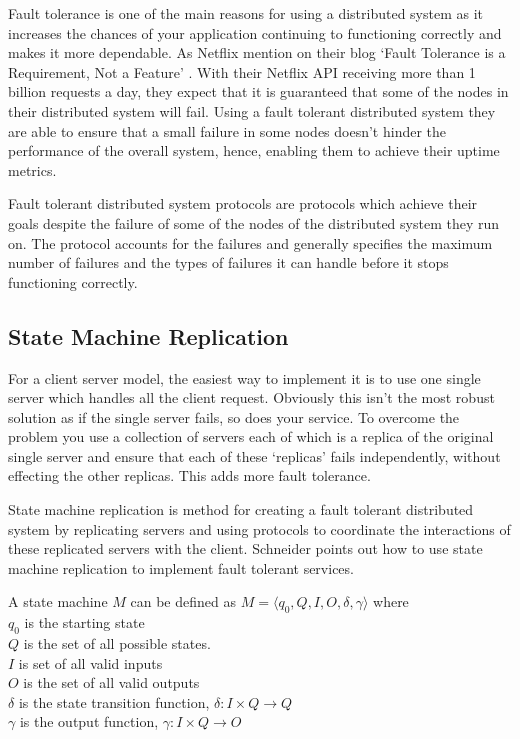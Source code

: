 Fault tolerance is one of the main reasons for using a distributed system as it
increases the chances of your application continuing to functioning correctly and
makes it more dependable. As Netflix mention on their blog
`Fault Tolerance is a Requirement, Not a Feature' \cite{20}.
With their Netflix API receiving more than 1 billion requests a day, they expect
that it is guaranteed that some of the nodes in their distributed system will fail.
Using a fault tolerant distributed system they are able to ensure that a small failure
in some nodes doesn't hinder the performance of the overall system, hence,
enabling them to achieve their uptime metrics.

Fault tolerant distributed system protocols are protocols which achieve their
goals despite the failure of some of the nodes of the distributed system they run on.
The protocol accounts for the failures and generally specifies the maximum number of
failures and the types of failures it can handle before it stops functioning correctly.

\subsection{State Machine Replication}

For a client server model, the easiest way to implement it is to use one single server
which handles all the client request. Obviously this isn't the most robust solution
as if the single server fails, so does your service. To overcome the problem you
use a collection of servers each of which is a replica of the original single server and
ensure that each of these `replicas' fails independently, without effecting the other replicas.
This adds more fault tolerance.

State machine replication is method for creating a fault tolerant distributed system
by replicating servers and using protocols to coordinate the interactions of these
replicated servers with the client. Schneider \cite{1} points out how to use
state machine replication to implement fault tolerant services.

A state machine $M$ can be defined as $M = \langle q_0, Q, I, O, \delta, \gamma \rangle$ where \\
$q_0$ is the starting state \\
$Q$ is the set of all possible states. \\
$I$ is set of all valid inputs \\
$O$ is the set of all valid outputs \\
$\delta$ is the state transition function, $\delta : I \times Q \rightarrow Q$ \\
$\gamma$ is the output function, $\gamma : I \times Q \rightarrow O$

